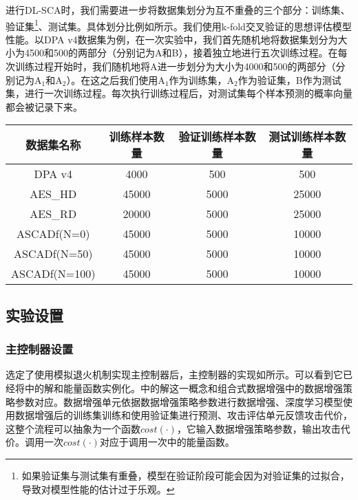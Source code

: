 {	进行DL-SCA时，我们需要进一步将数据集划分为互不重叠的三个部分：训练集、验证集\footnote{如果验证集与测试集有重叠，模型在验证阶段可能会因为对验证集的过拟合，导致对模型性能的估计过于乐观。}、测试集。具体划分比例如所示。我们使用k-fold交叉验证的思想评估模型性能。以DPA v4数据集为例，在一次实验中，我们首先随机地将数据集划分为大小为4500和500的两部分（分别记为A和B），接着独立地进行五次训练过程。在每次训练过程开始时，我们随机地将A进一步划分为大小为4000和500的两部分（分别记为A$_1$和A$_2$）。在这之后我们使用A$_1$作为训练集，A$_2$作为验证集，B作为测试集，进行一次训练过程。每次执行训练过程后，对测试集每个样本预测的概率向量都会被记录下来。%
	\begin{table}[!h]
		\label{tab:partition}
		\centering
		\begin{tabular}{c|ccc}
			\hline
			数据集名称&训练样本数量&验证训练样本数量&测试训练样本数量\\
			\hline
			DPA v4    &4000 &500 &500\\
			AES\_HD   &45000&5000&25000\\
			AES\_RD   &20000&5000&25000\\
			ASCADf(N=0)&45000&5000&10000\\
			ASCADf(N=50)&45000&5000&10000\\
			ASCADf(N=100)&45000&5000&10000\\
			\hline
		\end{tabular}
	\end{table}
	\subsection{实验设置}
	\subsubsection{主控制器设置}\label{subss:controllersettings}
	选定了使用模拟退火机制实现主控制器后，主控制器的实现如所示。可以看到它已经将中的解和能量函数实例化。中的解这一概念和组合式数据增强中的数据增强策略参数对应。数据增强单元依据数据增强策略参数进行数据增强、深度学习模型使用数据增强后的训练集训练和使用验证集进行预测、攻击评估单元反馈攻击代价，这整个流程可以抽象为一个函数$cost(\cdot)$，它输入数据增强策略参数，输出攻击代价。调用一次$cost(\cdot)$对应于调用一次中的能量函数。
	
}

